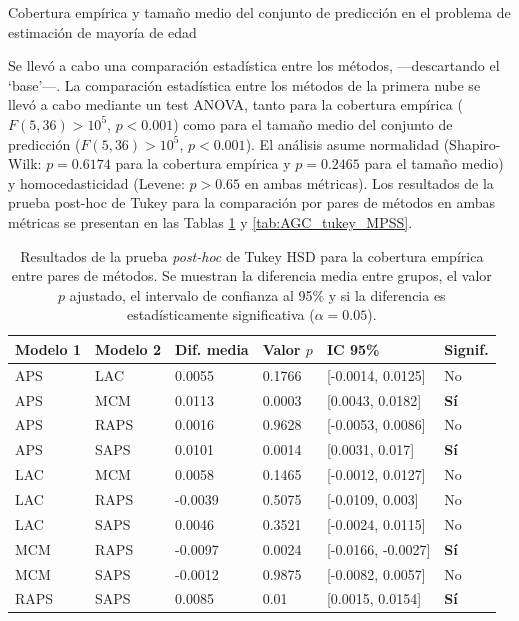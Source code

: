 \begin{StatisticsRef}{Cobertura empírica y tamaño medio del conjunto de predicción en el problema de estimación de mayoría de edad}

    Se llevó a cabo una comparación estadística entre los métodos, ---descartando el `base'---. La comparación estadística entre los métodos de la primera nube se llevó a cabo mediante un test ANOVA, tanto para la cobertura empírica ($F(5, 36) > 10^5$, $p<0.001$) como para el tamaño medio del conjunto de predicción ($F(5, 36) > 10^5$, $p<0.001$). El análisis asume normalidad (Shapiro-Wilk: $p=0.6174$ para la cobertura empírica y $p=0.2465$ para el tamaño medio) y homocedasticidad (Levene: $p>0.65$ en ambas métricas). Los resultados de la prueba post-hoc de Tukey para la comparación por pares de métodos en ambas métricas se presentan en las Tablas \ref{tab:AGC_tukey_EC} y \ref{tab:AGC_tukey_MPSS}.

    \renewcommand{\arraystretch}{1.2}
    \begin{table}[H]
        \small
        \centering
        \begin{tabular}{llllll}
        \toprule
        \textbf{Modelo 1} & \textbf{Modelo 2} & \textbf{Dif. media} & \textbf{Valor $p$} & \textbf{IC 95\%} & \textbf{Signif.} \\ \hline
        APS & LAC & 0.0055 & 0.1766 & [-0.0014, 0.0125] & No \\
        APS & MCM & 0.0113 & 0.0003 & [0.0043, 0.0182] & \textbf{Sí} \\
        APS & RAPS & 0.0016 & 0.9628 & [-0.0053, 0.0086] & No \\
        APS & SAPS & 0.0101 & 0.0014 & [0.0031, 0.017] & \textbf{Sí} \\
        LAC & MCM & 0.0058 & 0.1465 & [-0.0012, 0.0127] & No\\
        LAC & RAPS & -0.0039 & 0.5075 & [-0.0109, 0.003] & No \\
        LAC & SAPS & 0.0046 & 0.3521 & [-0.0024, 0.0115] & No \\
        MCM & RAPS & -0.0097 & 0.0024 & [-0.0166, -0.0027] & \textbf{Sí} \\
        MCM & SAPS & -0.0012 & 0.9875 & [-0.0082, 0.0057] & No \\
        RAPS & SAPS & 0.0085 & 0.01 & [0.0015, 0.0154] & \textbf{Sí} \\
        \bottomrule
        \end{tabular}
        \caption[
            Problema de clasificación de edad: 
            Resultados de la prueba \textit{post-hoc} de Tukey HSD para la cobertura empírica entre pares de métodos.
        ]{
            Resultados de la prueba \textit{post-hoc} de Tukey HSD para la cobertura empírica entre pares de métodos.
            Se muestran la diferencia media entre grupos, el valor $p$ ajustado, el intervalo de confianza al 95\% y si la diferencia es estadísticamente significativa ($\alpha = 0.05$).
        }
        \label{tab:AGC_tukey_EC}
    \end{table}


\end{StatisticsRef}
